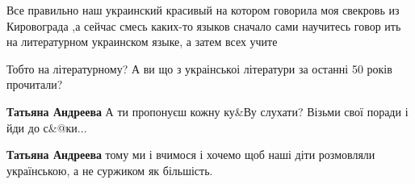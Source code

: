 \begin{itemize}

Все правильно наш украинский красивый на котором говорила моя свекровь из
Кировограда ,а сейчас смесь каких-то языков сначало сами научитесь говор ить на
литературном украинском языке, а затем всех учите


\begin{itemize}
Тобто на літературному? А ви що з украінськоі літератури за останні 50 років прочитали?


\textbf{Татьяна Андреева}
А ти пропонуєш кожну ку\&Ву слухати? Візьми свої поради і йди до с\&@ки...

\textbf{Татьяна Андреева} тому ми і вчимося і хочемо щоб наші діти розмовляли українською, а не суржиком як більшість.
\end{itemize}


\end{itemize}

